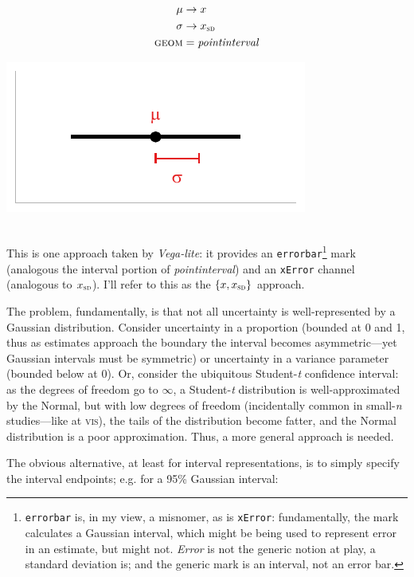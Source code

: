 \documentclass[journal]{vgtc}                     %
\newcommand{\equationfigure}[2]{%
\noindent
\begin{minipage}{.5\columnwidth}
\setlength{\abovedisplayskip}{0pt}
\setlength{\belowdisplayskip}{0pt}
#1\end{minipage}%
\begin{minipage}{.4\columnwidth}\centering #2 \end{minipage}%
\vspace{.5\belowdisplayskip}\\
}
\begin{document}
\equationfigure{
\begin{align*}
\mu &\rightarrow x\\
\sigma &\rightarrow x_\textsc{sd}\\
\textsc{geom} &= \mathit{pointinterval}
\end{align*}
}{\includegraphics[width=1.2\columnwidth]{figs/2-mean_sd_interval.pdf}}
This is one approach taken by \textit{Vega-lite}: it provides an \texttt{errorbar}\footnote{\label{foot:errorbar}\texttt{errorbar} is, in my view, a misnomer, as is \texttt{xError}: fundamentally, the mark calculates a Gaussian interval, which might be being used to represent error in an estimate, but might not. \textit{Error} is not the generic notion at play, a standard deviation is; and the generic mark is an interval, not an error bar.} mark (analogous the interval portion of \textit{pointinterval}) and an \texttt{xError}  channel (analogous to $x_\textsc{sd}$). I'll refer to this as the $\{x, x_\textsc{sd}\}$ approach.

The problem, fundamentally, is that not all uncertainty is well-represented by a Gaussian distribution. Consider uncertainty in a proportion (bounded at 0 and 1, thus as estimates approach the boundary the interval becomes asymmetric---yet Gaussian intervals must be symmetric) or uncertainty in a variance parameter (bounded below at 0). Or, consider the ubiquitous Student-\textit{t} confidence interval: as the degrees of freedom go to $\infty$, a Student-\textit{t} distribution is well-approximated by the Normal, but with low degrees of freedom (incidentally common in small-\textit{n} studies---like at \textsc{vis}), the tails of the distribution become fatter, and the Normal distribution is a poor approximation. Thus, a more general approach is needed.

The obvious alternative, at least for interval representations, is to simply specify the interval endpoints; e.g. for a 95\% Gaussian interval:
\end{document}
